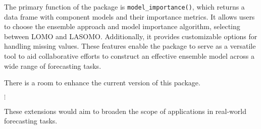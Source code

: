 \documentclass[
  article,
  shortnames,
  notitle]{jss}
\begin{document}
The primary function of the package is \texttt{model\_importance()},
which returns a data frame with component models and their importance
metrics. It allows users to choose the ensemble approach and model
importance algorithm, selecting between LOMO and LASOMO. Additionally,
it provides customizable options for handling missing values. These
features enable the package to serve as a versatile tool to aid
collaborative efforts to construct an effective ensemble model across a
wide range of forecasting tasks.

There is a room to enhance the current version of this package.

\(\vdots\)

These extensions would aim to broaden the scope of applications in
real-world forecasting tasks.


  
\end{document}
